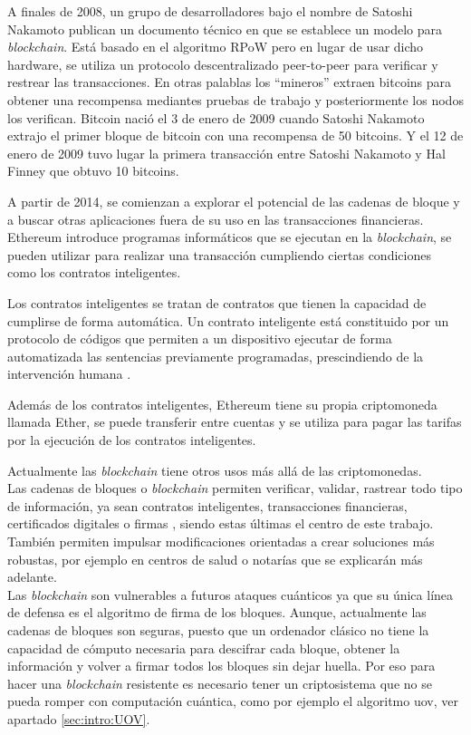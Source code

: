 A finales de 2008, un grupo de desarrolladores bajo el nombre de Satoshi Nakamoto publican un documento técnico en que se establece un modelo para \textit{blockchain}. Está basado en el algoritmo RPoW pero en lugar de usar dicho hardware, se utiliza un protocolo descentralizado peer-to-peer para verificar y restrear las transacciones. En otras palablas los ``mineros'' extraen bitcoins para obtener una recompensa mediantes pruebas de trabajo y posteriormente los nodos los verifican. Bitcoin nació el 3 de enero de 2009 cuando Satoshi Nakamoto extrajo el primer bloque de bitcoin con una recompensa de 50 bitcoins. Y el 12 de enero de 2009 tuvo lugar la primera transacción entre Satoshi Nakamoto y Hal Finney que obtuvo 10 bitcoins.

A partir de 2014, se comienzan a explorar el potencial de las cadenas de bloque y a buscar otras aplicaciones fuera de su uso en las transacciones financieras.
Ethereum introduce programas informáticos que se ejecutan en la \textit{blockchain}, se pueden utilizar para realizar una transacción cumpliendo ciertas condiciones como los contratos inteligentes.

Los contratos inteligentes se tratan de contratos que tienen la capacidad de cumplirse de forma automática. Un contrato inteligente está constituido por un protocolo de códigos que permiten a un dispositivo ejecutar de forma automatizada las sentencias previamente programadas, prescindiendo de la intervención humana \cite{contrato-inteligente}.

Además de los contratos inteligentes, Ethereum tiene su propia criptomoneda llamada Ether, se puede transferir entre cuentas y se utiliza para pagar las tarifas por la ejecución de los contratos inteligentes.

Actualmente las \textit{blockchain} tiene otros usos más allá de las criptomonedas.\\


Las cadenas de bloques o \textit{blockchain} permiten verificar, validar, rastrear todo tipo de información, ya sean contratos inteligentes, transacciones financieras, certificados digitales o firmas \cite{blockchain}, siendo estas últimas el centro de este trabajo. También permiten impulsar modificaciones orientadas a crear soluciones más robustas, por ejemplo en centros de salud o notarías que se explicarán más adelante.\\

Las \textit{blockchain} son vulnerables a futuros ataques cuánticos ya que su única línea de defensa es el algoritmo de firma de los bloques. Aunque, actualmente las cadenas de bloques son seguras, puesto que un ordenador clásico no tiene la capacidad de cómputo necesaria para descifrar cada bloque, obtener la información y volver a firmar todos los bloques sin dejar huella. Por eso para hacer una \textit{blockchain} resistente es necesario tener un criptosistema que no se pueda romper con computación cuántica, como por ejemplo el algoritmo \acrshort{uov}, ver apartado \ref{sec:intro:UOV}. \\

